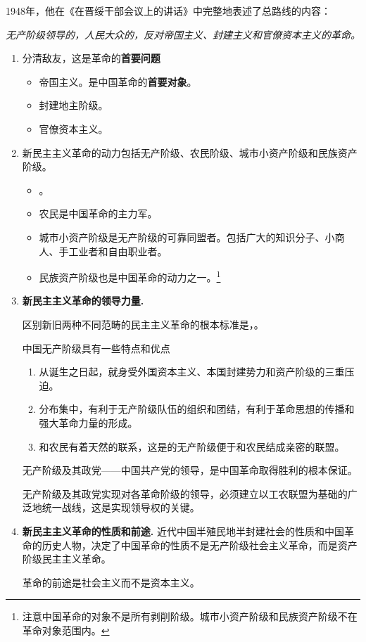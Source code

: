     1948年，他在《在晋绥干部会议上的讲话》中完整地表述了总路线的内容：

    \begin{center}
        \emph{无产阶级领导的，人民大众的，反对帝国主义、封建主义和官僚资本主义的革命。}
    \end{center}

    \begin{enumerate}
        \item {}
        分清敌友，这是革命的\textbf{首要问题}
        \begin{itemize}
            \item 帝国主义。是中国革命的\textbf{首要对象}。
            \item 封建地主阶级。
            \item 官僚资本主义。
        \end{itemize}
        \item {}
        新民主主义革命的动力包括无产阶级、农民阶级、城市小资产阶级和民族资产阶级。
        \begin{itemize}
            \item {}。
            \item 农民是中国革命的主力军。
            \item 城市小资产阶级是无产阶级的可靠同盟者。包括广大的知识分子、小商人、手工业者和自由职业者。
            \item 民族资产阶级也是中国革命的动力之一。\footnote{注意中国革命的对象不是所有剥削阶级。城市小资产阶级和民族资产阶级不在革命对象范围内。}
        \end{itemize}
        \item \textbf{新民主主义革命的领导力量.}

        区别新旧两种不同范畴的民主主义革命的根本标准是，。

        中国无产阶级具有一些特点和优点
        \begin{enumerate}
            \item 从诞生之日起，就身受外国资本主义、本国封建势力和资产阶级的三重压迫。
            \item 分布集中，有利于无产阶级队伍的组织和团结，有利于革命思想的传播和强大革命力量的形成。
            \item 和农民有着天然的联系，这是的无产阶级便于和农民结成亲密的联盟。
        \end{enumerate}
        无产阶级及其政党——中国共产党的领导，是中国革命取得胜利的根本保证。

        无产阶级及其政党实现对各革命阶级的领导，必须建立以工农联盟为基础的广泛地统一战线，这是实现领导权的关键。

        \item \textbf{新民主主义革命的性质和前途.}
        近代中国半殖民地半封建社会的性质和中国革命的历史人物，决定了中国革命的性质不是无产阶级社会主义革命，而是资产阶级民主主义革命。

        革命的前途是社会主义而不是资本主义。
    \end{enumerate}

